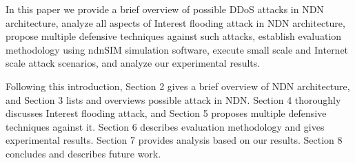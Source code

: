 

In this paper we provide a brief overview of possible DDoS attacks in NDN architecture, analyze all aspects of Interest flooding attack in NDN architecture, propose multiple defensive techniques against such attacks, establish evaluation methodology using ndnSIM simulation software, execute small scale and Internet scale attack scenarios, and analyze our experimental results.

Following this introduction, Section 2 gives a brief overview of NDN architecture, and Section 3 lists and overviews possible attack in NDN. Section 4 thoroughly discusses Interest flooding attack, and Section 5 proposes multiple defensive techniques against it. Section 6 describes evaluation methodology and gives experimental results. Section 7 provides analysis based on our results. Section 8 concludes and describes future work.




